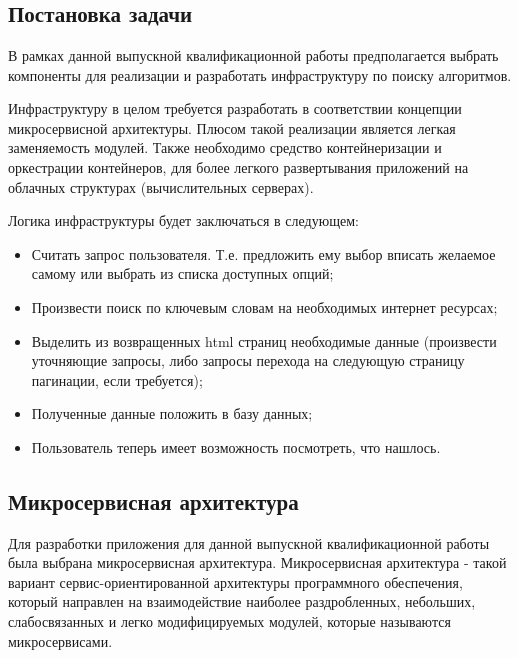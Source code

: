 
\chapter{\centering{}}
\label{cha:ch_1}

\section{Постановка задачи}
В рамках данной выпускной квалификационной работы предполагается выбрать
компоненты для реализации и разработать инфраструктуру по поиску алгоритмов.

Инфраструктуру в целом требуется разработать в соответствии концепции
микросервисной архитектуры. Плюсом такой реализации является легкая заменяемость
модулей. Также необходимо средство контейнеризации и оркестрации контейнеров,
для более легкого развертывания приложений на облачных структурах
(вычислительных серверах).

Логика инфраструктуры будет заключаться в следующем:
\begin{itemize}
    \item Считать запрос пользователя. Т.е. предложить ему выбор вписать желаемое самому или выбрать из списка доступных опций;
    \item Произвести поиск по ключевым словам на необходимых интернет ресурсах;
    \item Выделить из возвращенных html страниц необходимые данные (произвести уточняющие запросы, либо запросы перехода на следующую страницу пагинации, если требуется);
    \item Полученные данные положить в базу данных;
    \item Пользователь теперь имеет возможность посмотреть, что нашлось.
\end{itemize}

\section{Микросервисная архитектура}
Для разработки приложения для данной выпускной квалификационной работы была выбрана микросервисная архитектура.
Микросервисная архитектура - такой вариант сервис-ориентированной архитектуры
программного обеспечения, который направлен на взаимодействие наиболее
раздробленных, небольших, слабосвязанных и легко модифицируемых модулей, которые
называются микросервисами.

